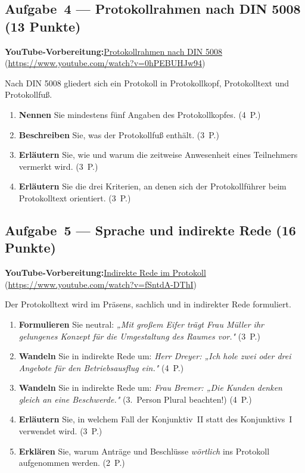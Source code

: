 \documentclass[11pt, a4paper]{article}
\begin{document}
\subsection*{Aufgabe~4 --- Protokollrahmen nach DIN 5008 (13 Punkte)}

\noindent\textbf{\color{bfwAccent}YouTube-Vorbereitung:}\enspace \href{https://www.youtube.com/watch?v=0hPEBUHJw94}{Protokollrahmen nach DIN 5008} (\url{https://www.youtube.com/watch?v=0hPEBUHJw94})

\medskip
Nach DIN 5008 gliedert sich ein Protokoll in Protokollkopf, Protokolltext und
Protokollfuß.

\begin{enumerate}[label=(\alph*)]
  \item \textbf{Nennen} Sie mindestens fünf Angaben des Protokollkopfes. \hfill (4~P.)
  \item \textbf{Beschreiben} Sie, was der Protokollfuß enthält. \hfill (3~P.)
  \item \textbf{Erläutern} Sie, wie und warum die zeitweise Anwesenheit eines Teilnehmers vermerkt wird. \hfill (3~P.)
  \item \textbf{Erläutern} Sie die drei Kriterien, an denen sich der Protokollführer beim Protokolltext orientiert. \hfill (3~P.)
\end{enumerate}

\subsection*{Aufgabe~5 --- Sprache und indirekte Rede (16 Punkte)}

\noindent\textbf{\color{bfwAccent}YouTube-Vorbereitung:}\enspace \href{https://www.youtube.com/watch?v=fSntdA-DThI}{Indirekte Rede im Protokoll} (\url{https://www.youtube.com/watch?v=fSntdA-DThI})

\medskip
Der Protokolltext wird im Präsens, sachlich und in indirekter Rede formuliert.

\begin{enumerate}[label=(\alph*)]
  \item \textbf{Formulieren} Sie neutral: \emph{„Mit großem Eifer trägt Frau Müller ihr gelungenes Konzept für die Umgestaltung des Raumes vor."} \hfill (3~P.)
  \item \textbf{Wandeln} Sie in indirekte Rede um: \emph{Herr Dreyer: „Ich hole zwei oder drei Angebote für den Betriebsausflug ein."} \hfill (4~P.)
  \item \textbf{Wandeln} Sie in indirekte Rede um: \emph{Frau Bremer: „Die Kunden denken gleich an eine Beschwerde."} (3.\ Person Plural beachten!) \hfill (4~P.)
  \item \textbf{Erläutern} Sie, in welchem Fall der Konjunktiv~II statt des Konjunktivs~I verwendet wird. \hfill (3~P.)
  \item \textbf{Erklären} Sie, warum Anträge und Beschlüsse \emph{wörtlich} ins Protokoll aufgenommen werden. \hfill (2~P.)
\end{enumerate}
\end{document}
